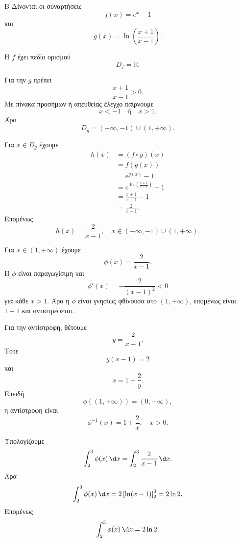 \begin{thema}{Β}
Δίνονται οι συναρτήσεις
\[
f(x)=e^x-1
\]
και
\[
g(x)=\ln\left(\frac{x+1}{x-1}\right).
\]
\begin{erwthma}
\item Η $f$ έχει πεδίο ορισμού
\[
D_f=\mathbb{R}.
\]

Για την $g$ πρέπει
\[
\frac{x+1}{x-1}>0.
\]
Με πίνακα προσήμων ή απευθείας έλεγχο παίρνουμε
\[
x<-1
\quad\text{ή}\quad
x>1.
\]
Άρα
\[
D_g=(-\infty,-1)\cup(1,+\infty).
\]

\item Για $x\in D_g$ έχουμε
\begin{align*}
h(x)
&=(f\circ g)(x)\\
&=f(g(x))\\
&=e^{g(x)}-1\\
&=e^{\ln\left(\frac{x+1}{x-1}\right)}-1\\
&=\frac{x+1}{x-1}-1\\
&=\frac{2}{x-1}.
\end{align*}
Επομένως
\[
{h(x)=\frac{2}{x-1},\quad x\in(-\infty,-1)\cup(1,+\infty)}.
\]

\item Για $x\in(1,+\infty)$ έχουμε
\[
\phi(x)=\frac{2}{x-1}.
\]
Η $\phi$ είναι παραγωγίσιμη και
\[
\phi'(x)=-\frac{2}{(x-1)^2}<0
\]
για κάθε $x>1$. Άρα η $\phi$ είναι γνησίως φθίνουσα στο $(1,+\infty)$, επομένως είναι $1-1$ και αντιστρέφεται.

Για την αντίστροφη, θέτουμε
\[
y=\frac{2}{x-1}.
\]
Τότε
\[
y(x-1)=2
\]
και
\[
x=1+\frac{2}{y}.
\]
Επειδή
\[
\phi((1,+\infty))=(0,+\infty),
\]
η αντίστροφη είναι
\[
{\phi^{-1}(x)=1+\frac{2}{x},\quad x>0}.
\]

\item Υπολογίζουμε
\[
\dint_2^3 \phi(x)\,\d x
=\dint_2^3 \frac{2}{x-1}\,\d x.
\]
Άρα
\[
\dint_2^3 \phi(x)\,\d x
=2\left[\ln(x-1)\right]_2^3
=2\ln2.
\]
Επομένως
\[
{\dint_2^3 \phi(x)\,\d x=2\ln2}.
\]
\end{erwthma}
\end{thema}

